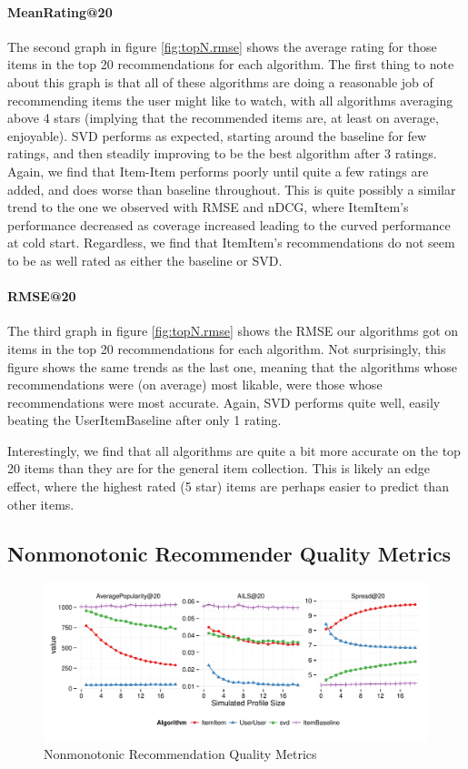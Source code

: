 \documentclass[letterpaper]{sig-alternate}
\begin{document}
  \paragraph{MeanRating@20}
  The second graph in figure \ref{fig:topN.rmse} shows the average rating for those items in the top 20 recommendations for each algorithm.
  The first thing to note about this graph is that all of these algorithms are doing a reasonable job of recommending items the user might like to watch, with all algorithms averaging above 4 stars (implying that the recommended items are, at least on average, enjoyable).
  SVD performs as expected, starting around the baseline for few ratings, and then steadily improving to be the best algorithm after 3 ratings.
  Again, we find that Item-Item performs poorly until quite a few ratings are added, and does worse than baseline throughout.
  This is quite possibly a similar trend to the one we observed with RMSE and nDCG, where ItemItem's performance decreased as coverage increased leading to the curved performance at cold start.
  Regardless, we find that ItemItem's recommendations do not seem to be as well rated as either the baseline or SVD.
    
  \paragraph{RMSE@20}
  The third graph in figure \ref{fig:topN.rmse} shows the RMSE our algorithms got on items in the top 20 recommendations for each algorithm.
  Not surprisingly, this figure shows the same trends as the last one, meaning that the algorithms whose recommendations were (on average) most likable, were those whose recommendations were most accurate.
  Again, SVD performs quite well, easily beating the UserItemBaseline after only 1 rating.
  
  Interestingly, we find that all algorithms are quite a bit more accurate on the top 20 items than they are for the general item collection.
  This is likely an edge effect, where the highest rated (5 star) items are perhaps easier to predict than other items.


\subsection{Nonmonotonic Recommender Quality Metrics}

\begin{figure}[ht!]
  \centering
  \includegraphics[width=\linewidth]{../lenskit/output/ekstrandTuned20/popdiv.pdf}
  \caption{Nonmonotonic Recommendation Quality Metrics}
  \label{fig:pop}
\end{figure}
\end{document}
